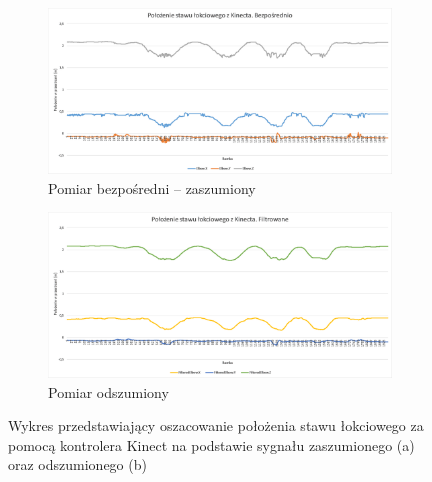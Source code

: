 \begin{savenotes}
	\begin{figure}[h]
		\centering
		\begin{subfigure}[b]{0.49\textwidth}
			\centering
			\includegraphics[width=\linewidth]{images/kinectElbowRaw.png}	
			\caption{Pomiar bezpośredni -- zaszumiony}
			\label{fig:hybrid:kinect:noised}
		\end{subfigure}
		\begin{subfigure}[b]{0.49\textwidth}
			\centering
			\includegraphics[width=\linewidth]{images/kinectElbowFiltered.png}	
			\caption{Pomiar odszumiony}
			\label{fig:hybrid:kinect:denoised}
		\end{subfigure}				
		\caption[Wykres przedstawiający oszacowanie położenia stawu łokciowego za pomocą kontrolera Kinect na podstawie sygnału zaszumionego oraz odszumionego]{Wykres przedstawiający oszacowanie położenia stawu łokciowego za pomocą kontrolera Kinect na podstawie sygnału zaszumionego (a) oraz odszumionego (b)}
	\end{figure}
\end{savenotes}
								
